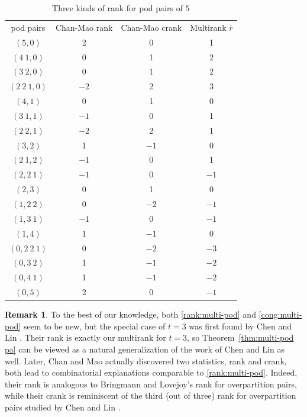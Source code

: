 \documentclass[12pt]{amsart}
\numberwithin{equation}{section}
\theoremstyle{plain}
\theoremstyle{definition}
\newtheorem{remark}[theorem]{Remark}
\begin{document}
\begin{table}[htbp]\caption{Three kinds of rank for pod pairs of $5$}
\centering
\begin{tabular}{|c||c|c|c|}
pod pairs  &Chan-Mao rank &Chan-Mao crank & Multirank $\overline{r}$ \\
$(5,0)$ &2 &0 &1  \\
$(4~1,0)$ &0 &1 &2  \\
$(3~2,0)$ &0 &1 &2  \\
$(2~2~1,0)$ &$-2$ &2 &3  \\
$(4,1)$ &0 &1 &0  \\
$(3~1,1)$ &$-1$ &0 &1 \\
$(2~2,1)$ &$-2$ &2 &1  \\
$(3,2)$ &1 &$-1$ &0  \\
$(2~1,2)$ &$-1$ &0 &1  \\
$(2,2~1)$ &$-1$ &0 &$-1$  \\
$(2,3)$ &0 &1 &0  \\
$(1,2~2)$ &0 &$-2$ &$-1$  \\
$(1,3~1)$ &$-1$ &0 &$-1$  \\
$(1,4)$ &1 &$-1$ &0  \\
$(0,2~2~1)$ &0 &$-2$ &$-3$  \\
$(0,3~2)$ &1 &$-1$ &$-2$  \\
$(0,4~1)$ &1 &$-1$ &$-2$  \\
$(0,5)$ &2 &0  &$-1$  \\
\end{tabular}\label{3rank}
\end{table}

\begin{remark}
To the best of our knowledge, both \eqref{rank:multi-pod} and \eqref{cong:multi-pod} seem to be new, but the special case of $t=3$ was first found by Chen and Lin \cite{CL2}. Their rank is exactly our multirank for $t=3$, so Theorem~\ref{thm:multi-pod pa} can be viewed as a natural generalization of the work of Chen and Lin as well. Later, Chan and Mao \cite{CM} actually discovered two statistics, rank and crank, both lead to combinatorial explanations comparable to \eqref{rank:multi-pod}. Indeed, their rank is analogous to Bringmann and Lovejoy's rank \cite{BL} for overpartition pairs, while their crank is reminiscent of the third (out of three) rank for overpartition pairs studied by Chen and Lin \cite{CLi}.
\end{remark}
\end{document}
